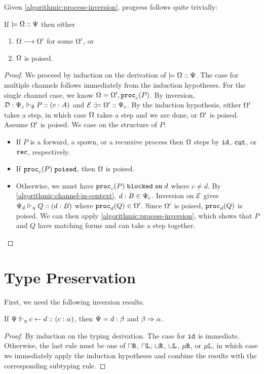 Given \cref{algorithmic:process-inversion}, progress follows quite trivially:

\begin{theorem}[Progress]
If $\models {\Omega} :: {\Psi}$ then either
\begin{enumerate}
  \item $\Omega \longrightarrow \Omega'$ for some $\Omega'$, or
  \item $\Omega$ is poised.
\end{enumerate}
\end{theorem}
\begin{proof}
  We proceed by induction on the derivation of $\models {\Omega} :: {\Psi}$. The case for multiple channels follows immediately from the induction hypotheses. For the single channel case, we know $\Omega = \Omega', \mathtt{proc}_{c}(P)$. By inversion, $\mathcal{D} : {\Psi_c} \Vdash_{\emptyset} P :: (c : A)$ and $\mathcal{E} : \models {\Omega'} :: {\Psi_c}$. By the induction hypothesis, either $\Omega'$ takes a step, in which case $\Omega$ takes a step and we are done, or $\Omega'$ is poised. Assume $\Omega'$ is poised. We case on the structure of $P$:
  \begin{itemize}
    \item If $P$ is a forward, a spawn, or a recursive process then $\Omega$ steps by $\texttt{id}$, $\texttt{cut}$, or $\texttt{rec}$, respectively.
    \item If $\mathtt{proc}_{c}(P)\;\mathtt{poised}$, then $\Omega$ is poised.
    \item Otherwise, we must have ${\mathtt{proc}_{c}(P)}\;\mathtt{blocked\;on}\;{d}$ where $c \neq d$. By \cref{algorithmic:channel-in-context}, $d : B \in \Psi_c$. Inversion on $\mathcal{E}$ gives ${\Psi_d} \Vdash_{\eta} Q :: (d : B)$ where $\mathtt{proc}_{d}(Q) \in \Omega'$. Since $\Omega'$ is poised, $\mathtt{proc}_{d}(Q)$ is poised. We can then apply \cref{algorithmic:process-inversion}, which shows that $P$ and $Q$ have matching forms and can take a step together.
  \end{itemize}
\end{proof}


\section{Type Preservation}

First, we need the following inversion results.

\begin{lemma}[Inversion of Id]
  \label{algorithmic:id-inversion}
If ${\Psi} \Vdash_{\eta} c \leftarrow d :: (c : \alpha)$, then $\Psi = d : \beta$ and $\beta \mathrel\Rightarrow \alpha$.
\end{lemma}
\begin{proof}
  By induction on the typing derivation. The case for $\texttt{id}$ is immediate. Otherwise, the last rule must be one of $\mathbin{\sqcap}\texttt{R}$, $\mathbin{\sqcap}\texttt{L}$, $\mathbin{\sqcup}\texttt{R}$, $\mathbin{\sqcup}\texttt{L}$, $\mu\texttt{R}$, or $\mu\texttt{L}$, in which case we immediately apply the induction hypotheses and combine the results with the corresponding subtyping rule.
\end{proof}

